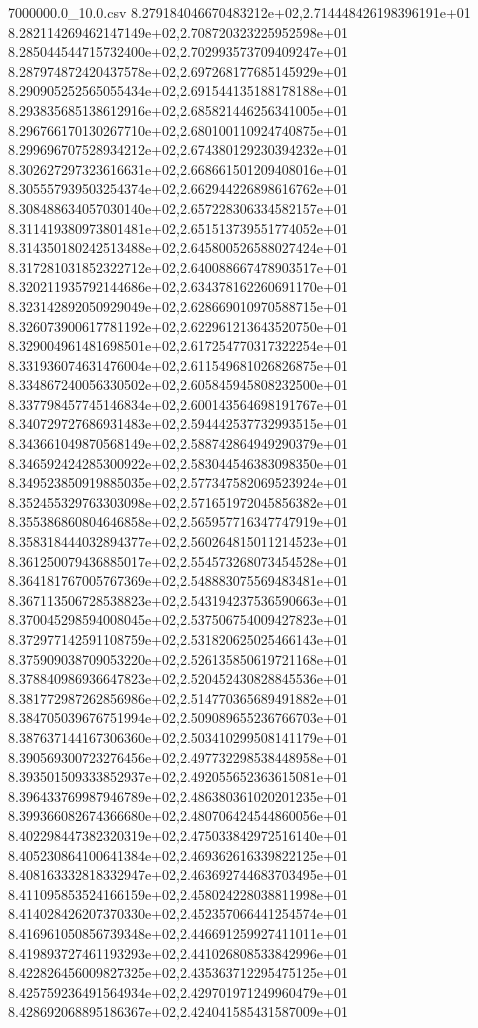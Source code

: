 \begin{filecontents*}{7000000.0_10.0.csv}
8.279184046670483212e+02,2.714448426198396191e+01
8.282114269462147149e+02,2.708720323225952598e+01
8.285044544715732400e+02,2.702993573709409247e+01
8.287974872420437578e+02,2.697268177685145929e+01
8.290905252565055434e+02,2.691544135188178188e+01
8.293835685138612916e+02,2.685821446256341005e+01
8.296766170130267710e+02,2.680100110924740875e+01
8.299696707528934212e+02,2.674380129230394232e+01
8.302627297323616631e+02,2.668661501209408016e+01
8.305557939503254374e+02,2.662944226898616762e+01
8.308488634057030140e+02,2.657228306334582157e+01
8.311419380973801481e+02,2.651513739551774052e+01
8.314350180242513488e+02,2.645800526588027424e+01
8.317281031852322712e+02,2.640088667478903517e+01
8.320211935792144686e+02,2.634378162260691170e+01
8.323142892050929049e+02,2.628669010970588715e+01
8.326073900617781192e+02,2.622961213643520750e+01
8.329004961481698501e+02,2.617254770317322254e+01
8.331936074631476004e+02,2.611549681026826875e+01
8.334867240056330502e+02,2.605845945808232500e+01
8.337798457745146834e+02,2.600143564698191767e+01
8.340729727686931483e+02,2.594442537732993515e+01
8.343661049870568149e+02,2.588742864949290379e+01
8.346592424285300922e+02,2.583044546383098350e+01
8.349523850919885035e+02,2.577347582069523924e+01
8.352455329763303098e+02,2.571651972045856382e+01
8.355386860804646858e+02,2.565957716347747919e+01
8.358318444032894377e+02,2.560264815011214523e+01
8.361250079436885017e+02,2.554573268073454528e+01
8.364181767005767369e+02,2.548883075569483481e+01
8.367113506728538823e+02,2.543194237536590663e+01
8.370045298594008045e+02,2.537506754009427823e+01
8.372977142591108759e+02,2.531820625025466143e+01
8.375909038709053220e+02,2.526135850619721168e+01
8.378840986936647823e+02,2.520452430828845536e+01
8.381772987262856986e+02,2.514770365689491882e+01
8.384705039676751994e+02,2.509089655236766703e+01
8.387637144167306360e+02,2.503410299508141179e+01
8.390569300723276456e+02,2.497732298538448958e+01
8.393501509333852937e+02,2.492055652363615081e+01
8.396433769987946789e+02,2.486380361020201235e+01
8.399366082674366680e+02,2.480706424544860056e+01
8.402298447382320319e+02,2.475033842972516140e+01
8.405230864100641384e+02,2.469362616339822125e+01
8.408163332818332947e+02,2.463692744683703495e+01
8.411095853524166159e+02,2.458024228038811998e+01
8.414028426207370330e+02,2.452357066441254574e+01
8.416961050856739348e+02,2.446691259927411011e+01
8.419893727461193293e+02,2.441026808533842996e+01
8.422826456009827325e+02,2.435363712295475125e+01
8.425759236491564934e+02,2.429701971249960479e+01
8.428692068895186367e+02,2.424041585431587009e+01

\end{filecontents*}
